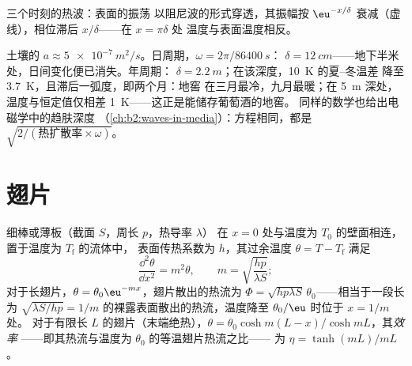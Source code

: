 \begin{omfigure}

{\small 三个时刻的热波：表面的振荡
以阻尼波的形式穿透，其振幅按 $\eu^{-x/\delta}$
衰减（虚线），相位滞后 $x/\delta$——在 $x = \pi\delta$ 处
温度与表面温度相反。}
\end{omfigure}

\begin{example}[土壤、地窖与葡萄酒]\label{ex:b2:heat-conduction:soil}
土壤的 $a \approx \qty{5e-7}{m^2/s}$。日周期，$\omega = 2\pi/\qty{86400}{s}$：
$\delta = \qty{12}{cm}$——地下半米处，日间变化便已消失。年周期：
$\delta = \qty{2.2}{m}$；在该深度，\qty{10}{K} 的夏–冬温差
降至 \qty{3.7}{K}，且滞后一弧度，即两个月：地窖
在三月最冷，九月最暖；在 \qty{5}{m} 深处，
温度与恒定值仅相差 \qty{1}{K}——这正是能储存葡萄酒的地窖。
同样的数学也给出电磁学中的趋肤深度
（\cref{ch:b2:waves-in-media}）：方程相同，都是 $\sqrt{2/(\text{热扩散率}
\times\omega)}$。
\end{example}

\section{翅片}

\begin{proposition}[冷却翅片]\label{prop:b2:heat-conduction:fin}
细棒或薄板（截面 $S$，周长 $p$，热导率 $\lambda$）
在 $x = 0$ 处与温度为 $T_0$ 的壁面相连，置于温度为 $T_{\text{f}}$ 的流体中，
表面传热系数为 $h$，其过余温度 $\theta = T - T_{\text{f}}$
满足
\[
\frac{\dd^2\theta}{\dd x^2} = m^2\theta, \qquad m = \sqrt{\frac{hp}{\lambda S}} ;
\]
对于长翅片，$\theta = \theta_0\eu^{-mx}$，翅片散出的热流为 $\Phi =
\sqrt{hp\lambda S}\,\theta_0$——相当于一段长为 $\sqrt{\lambda
S/hp} = 1/m$ 的裸露表面散出的热流，温度降至 $\theta_0/\eu$ 时位于 $x = 1/m$ 处。
对于有限长 $L$ 的翅片（末端绝热），$\theta =
\theta_0\cosh m(L-x)/\cosh mL$，其\emph{效率}
——即其热流与温度为 $\theta_0$ 的等温翅片热流之比——
为 $\eta = \tanh(mL)/mL$。
\end{proposition}

